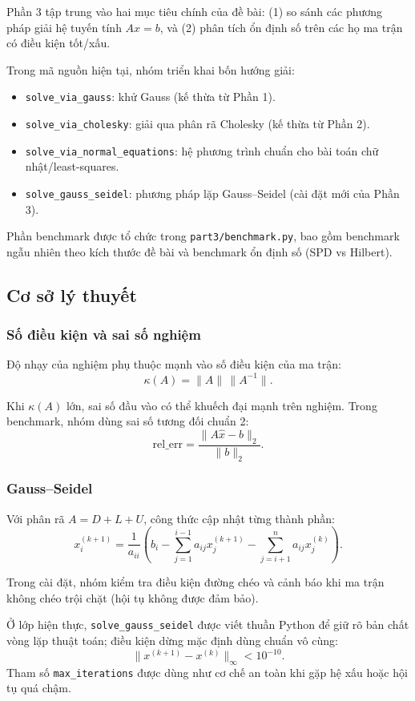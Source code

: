 \documentclass[a4paper]{article}
\begin{document}
Phần 3 tập trung vào hai mục tiêu chính của đề bài: (1) so sánh các phương pháp giải hệ tuyến tính $Ax=b$, và (2) phân tích ổn định số trên các họ ma trận có điều kiện tốt/xấu.

Trong mã nguồn hiện tại, nhóm triển khai bốn hướng giải:
\begin{itemize}
    \item \texttt{solve\_via\_gauss}: khử Gauss (kế thừa từ Phần 1).
    \item \texttt{solve\_via\_cholesky}: giải qua phân rã Cholesky (kế thừa từ Phần 2).
    \item \texttt{solve\_via\_normal\_equations}: hệ phương trình chuẩn cho bài toán chữ nhật/least-squares.
    \item \texttt{solve\_gauss\_seidel}: phương pháp lặp Gauss--Seidel (cài đặt mới của Phần 3).
\end{itemize}

Phần benchmark được tổ chức trong \texttt{part3/benchmark.py}, bao gồm benchmark ngẫu nhiên theo kích thước đề bài và benchmark ổn định số (SPD vs Hilbert).

\subsection{Cơ sở lý thuyết}

\subsubsection{Số điều kiện và sai số nghiệm}

Độ nhạy của nghiệm phụ thuộc mạnh vào số điều kiện của ma trận:
$$\kappa(A)=\|A\|\,\|A^{-1}\|.$$

Khi $\kappa(A)$ lớn, sai số đầu vào có thể khuếch đại mạnh trên nghiệm. Trong benchmark, nhóm dùng sai số tương đối chuẩn 2:
$$\text{rel\_err}=\frac{\|A\hat{x}-b\|_2}{\|b\|_2}.$$

\subsubsection{Gauss--Seidel}

Với phân rã $A=D+L+U$, công thức cập nhật từng thành phần:
$$x_i^{(k+1)}=\frac{1}{a_{ii}}\left(b_i-\sum_{j=1}^{i-1}a_{ij}x_j^{(k+1)}-\sum_{j=i+1}^{n}a_{ij}x_j^{(k)}\right).$$

Trong cài đặt, nhóm kiểm tra điều kiện đường chéo và cảnh báo khi ma trận không chéo trội chặt (hội tụ không được đảm bảo).

Ở lớp hiện thực, \texttt{solve\_gauss\_seidel} được viết thuần Python để giữ rõ bản chất vòng lặp thuật toán; điều kiện dừng mặc định dùng chuẩn vô cùng:
\[
\|x^{(k+1)}-x^{(k)}\|_\infty < 10^{-10}.
\]
Tham số \texttt{max\_iterations} được dùng như cơ chế an toàn khi gặp hệ xấu hoặc hội tụ quá chậm.
\end{document}
